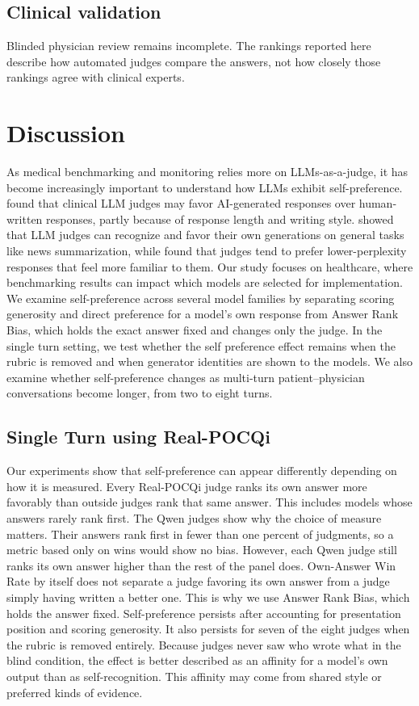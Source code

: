 \documentclass[11pt]{article}
\begin{document}
\subsection{Clinical validation}

Blinded physician review remains incomplete. The rankings reported here
describe how automated judges compare the answers, not how closely those
rankings agree with clinical experts.




\section{Discussion}
As medical benchmarking and monitoring relies more on LLMs-as-a-judge, it has become increasingly important to understand how LLMs exhibit self-preference. \cite{alvarezarenas2026unreliable} found that clinical LLM judges may favor AI-generated responses over human-written responses, partly because of response length and writing style.
\cite{panickssery2024llm} showed that LLM judges can recognize and favor their own generations on general tasks like news summarization, while \cite{wataoka2025selfpreference} found that judges tend to prefer lower-perplexity responses that feel more familiar to them. Our study focuses on healthcare, where benchmarking results can impact which models are selected for implementation. We examine self-preference across several model families by separating scoring generosity and direct preference for a model’s own response from Answer Rank Bias, which holds the exact answer fixed and changes only the judge. In the single turn setting, we test whether the self preference effect remains when the rubric is removed and when generator identities are shown to the models. We also examine whether self-preference changes as multi-turn patient–physician conversations become longer, from two to eight turns.

\subsection{Single Turn using Real-POCQi}

Our experiments show that self-preference can appear differently depending on how it is measured. Every Real-POCQi judge ranks its own answer more favorably than outside judges rank that same answer. This includes models whose answers rarely rank first. The Qwen judges show why the choice of measure matters. Their answers rank first in fewer than one percent of judgments, so a metric based only on wins would show no bias. However, each Qwen judge still ranks its own answer higher than the rest of the panel does. Own-Answer Win Rate by itself does not separate a judge favoring its own answer from a judge simply having written a better one. This is why we use Answer Rank Bias, which holds the answer fixed. Self-preference persists after accounting for presentation position and scoring generosity. It also persists for seven of the eight judges when the rubric is removed entirely. Because judges never saw who wrote what in the blind condition, the effect is better described as an affinity for a model's own output than as self-recognition. This affinity may come from shared style or preferred kinds of evidence.
\end{document}
